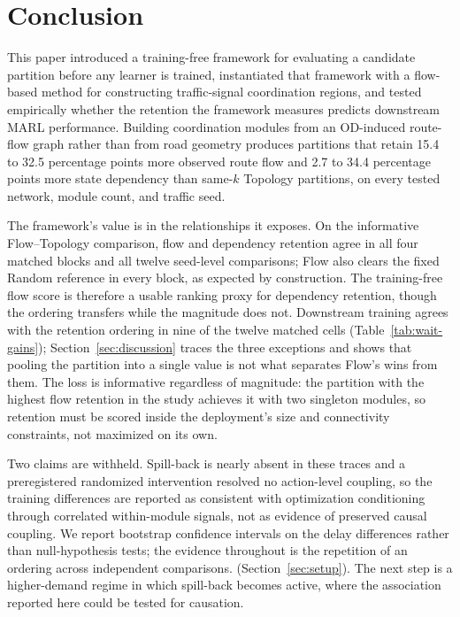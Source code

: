 \documentclass[journal]{IEEEtran}
\theoremstyle{definition}
\begin{document}
\section{Conclusion}
\label{sec:conclusion}

This paper introduced a training-free framework for evaluating a candidate partition before any learner is trained, instantiated that framework with a flow-based method for constructing traffic-signal coordination regions, and tested empirically whether the retention the framework measures predicts downstream MARL performance.
Building coordination modules from an OD-induced route-flow graph rather than from road geometry produces partitions that retain 15.4 to 32.5 percentage points more observed route flow and 2.7 to 34.4 percentage points more state dependency than same-$k$ Topology partitions, on every tested network, module count, and traffic seed.

The framework's value is in the relationships it exposes.
On the informative Flow--Topology comparison, flow and dependency retention agree in all four matched blocks and all twelve seed-level comparisons; Flow also clears the fixed Random reference in every block, as expected by construction. The training-free flow score is therefore a usable ranking proxy for dependency retention, though the ordering transfers while the magnitude does not.
Downstream training agrees with the retention ordering in nine of the twelve matched cells (Table~\ref{tab:wait-gains}); Section~\ref{sec:discussion} traces the three exceptions and shows that pooling the partition into a single value is not what separates Flow's wins from them. The loss is informative regardless of magnitude: the partition with the highest flow retention in the study achieves it with two singleton modules, so retention must be scored inside the deployment's size and connectivity constraints, not maximized on its own.

Two claims are withheld.
Spill-back is nearly absent in these traces and a preregistered randomized intervention resolved no action-level coupling, so the training differences are reported as consistent with optimization conditioning through correlated within-module signals, not as evidence of preserved causal coupling. We report bootstrap confidence intervals on the delay differences rather than null-hypothesis tests; the evidence throughout is the repetition of an ordering across independent comparisons. (Section~\ref{sec:setup}). The next step is a higher-demand regime in which spill-back becomes active, where the association reported here could be tested for causation.
\end{document}
